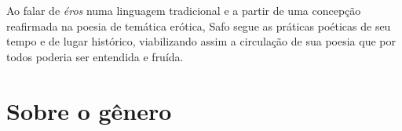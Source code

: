 Ao falar de \textit{éros} numa linguagem tradicional e a partir de uma concepção
reafirmada na poesia de temática erótica, Safo segue as práticas poéticas de
seu tempo e de lugar histórico, viabilizando assim a circulação de sua poesia
que por todos poderia ser entendida e fruída. 



\section{Sobre o gênero}



